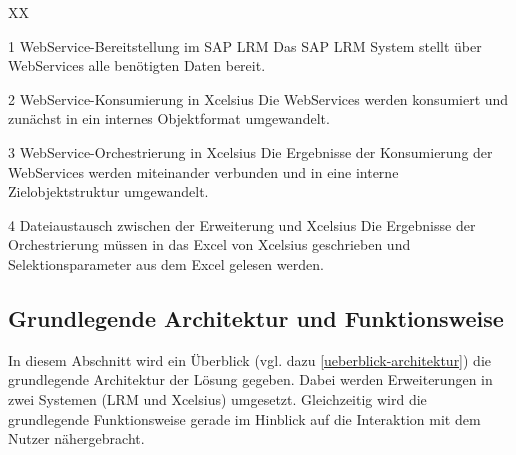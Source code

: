 \begin{seToplist} { XX }
\item[1] WebService-Bereitstellung im SAP LRM \newline
Das SAP LRM System stellt über WebServices alle benötigten Daten bereit.

\item[2] WebService-Konsumierung in Xcelsius \newline
Die WebServices werden konsumiert und zunächst in ein internes Objektformat umgewandelt.

\item[3] WebService-Orchestrierung in Xcelsius \newline
Die Ergebnisse der Konsumierung der WebServices werden miteinander verbunden und in eine interne Zielobjektstruktur umgewandelt.

\item[4] Dateiaustausch zwischen der Erweiterung und Xcelsius \newline
Die Ergebnisse der Orchestrierung müssen in das Excel von Xcelsius geschrieben und Selektionsparameter aus dem Excel gelesen werden.

\end{seToplist}

\subsection{Grundlegende Architektur und Funktionsweise}
In diesem Abschnitt wird ein Überblick (vgl. dazu \vref{ueberblick-architektur}) die grundlegende Architektur der Lösung gegeben. Dabei werden Erweiterungen in zwei Systemen (LRM und Xcelsius) umgesetzt. Gleichzeitig wird die grundlegende Funktionsweise gerade im Hinblick auf die Interaktion mit dem Nutzer nähergebracht.

